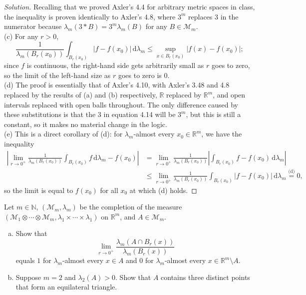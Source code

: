 \documentclass[10pt]{article}
\newcommand{\dd}{\,\mathrm{d}}
\providecommand{\NN}{\mathbb N}
\providecommand{\RR}{\mathbb R}
\providecommand{\ii}{\item}
\newenvironment{soln}{\begin{proof}[Solution]}{\end{proof}}
\providecommand{\abs}[1]{\left\lvert #1\right\rvert}
\begin{document}
\begin{soln}
    Recalling that we proved Axler's 4.4 for arbitrary metric spaces in class,
    the inequality is proven identically to Axler's 4.8,
    where $3^m$ replaces $3$ in the numerator because
    $\lambda_m(3 * B) = 3^m \lambda_m(B)$ for any $B\in\mathcal M_m$.
    \\

    (c) For any $r > 0$,
    \begin{equation*}
	\frac 1{\lambda_m(B_r(x_0))}\int_{B_r(x_0)}\abs{f - f(x_0)}\dd\lambda_m
	\le \sup_{x\in B_r(x_0)}\abs{f(x) - f(x_0)};
    \end{equation*}
    since $f$ is continuous, the right-hand side gets arbitrarily small
    as $r$ goes to zero, so the limit of the left-hand size
    as $r$ goes to zero is $0$.
    \\

    (d) The proof is essentially that of Axler's 4.10,
    with Axler's 3.48 and 4.8 replaced by the results of (a) and (b) respectively,
    $\RR$ replaced by $\RR^m$, and open intervals replaced with open balls throughout.
    The only difference caused by these substitutions is that
    the $3$ in equation 4.14 will be $3^m$, but this is still a constant,
    so it makes no material change in the logic.
    \\

    (e) This is a direct corollary of (d):
    for $\lambda_m$-almost every $x_0\in\RR^m$, we have the inequality
    \begin{align*}
	\abs{\lim_{r\to0^+}
	\frac 1{\lambda_m(B_r(x_0))}\int_{B_r(x_0)} f \dd\lambda_m
	- f(x_0)}
	&= \lim_{r\to0^+}\frac 1{\lambda_m(B_r(x_0))}
	\abs{\int_{B_r(x_0)}f - f(x_0)\dd\lambda_m}\\
	&\le \lim_{r\to0^+}
	\frac 1{\lambda_m(B_r(x_0))}\int_{B_r(x_0)}\abs{f - f(x_0)}\dd\lambda_m
	\overset{\text{(d)}}= 0,
    \end{align*}
    so the limit is equal to $f(x_0)$ for all $x_0$ at which (d) holds.
\end{soln}

\begin{problem}
    Let $m\in\NN$, $(\mathcal M_m,\lambda_m)$ be the completion of
    the measure $(\mathcal M_1\otimes\cdots\otimes\mathcal M_m,
    \lambda_1\times\cdots\times\lambda_1)$ on $\RR^m$,
    and $A\in\mathcal M_m$.
    \begin{enumerate}[(a)]
        \ii Show that
	\begin{equation*}
	    \lim_{r\to0^+}\frac{\lambda_m(A\cap B_r(x))}{\lambda_m(B_r(x))}
	\end{equation*}
	equals $1$ for $\lambda_m$-almost every $x\in A$
	and $0$ for $\lambda_m$-almost every $x\in\RR^m\setminus A$.
	\ii Suppose $m = 2$ and $\lambda_2(A) > 0$. Show that
	$A$ contains three distinct points that form an equilateral triangle.
    \end{enumerate}
\end{problem}
\end{document}
